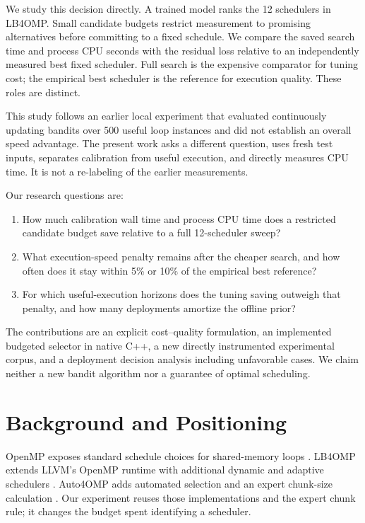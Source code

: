 \documentclass[conference]{IEEEtran}
\begin{document}
We study this decision directly. A trained model ranks the 12 schedulers in
LB4OMP. Small candidate budgets restrict measurement to promising alternatives
before committing to a fixed schedule. We compare the saved search time and
process CPU seconds with the residual loss relative to an independently
measured best fixed scheduler. Full search is the expensive comparator for
tuning cost; the empirical best scheduler is the reference for execution
quality. These roles are distinct.

This study follows an earlier local experiment that evaluated continuously
updating bandits over 500 useful loop instances and did not establish an
overall speed advantage. The present work asks a different question, uses
fresh test inputs, separates calibration from useful execution, and directly
measures CPU time. It is not a re-labeling of the earlier measurements.

Our research questions are:

\begin{enumerate}
\item How much calibration wall time and process CPU time does a restricted
candidate budget save relative to a full 12-scheduler sweep?
\item What execution-speed penalty remains after the cheaper search, and how
often does it stay within 5\% or 10\% of the empirical best reference?
\item For which useful-execution horizons does the tuning saving outweigh that
penalty, and how many deployments amortize the offline prior?
\end{enumerate}

The contributions are an explicit cost--quality formulation, an implemented
budgeted selector in native C++, a new directly instrumented experimental
corpus, and a deployment decision analysis including unfavorable cases.
We claim neither a new bandit algorithm nor a guarantee of optimal scheduling.

\section{Background and Positioning}

OpenMP exposes standard schedule choices for shared-memory loops
\cite{openmp}. LB4OMP extends LLVM's OpenMP runtime with additional dynamic
and adaptive schedulers \cite{lb4omp}. Auto4OMP adds automated selection and
an expert chunk-size calculation \cite{auto4omp}. Our experiment reuses those
implementations and the expert chunk rule; it changes the budget spent
identifying a scheduler.
\end{document}
